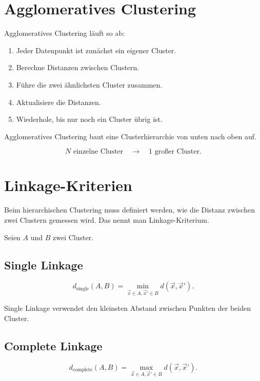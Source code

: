 \section{Agglomeratives Clustering}

Agglomeratives Clustering läuft so ab:

\begin{enumerate}
    \item Jeder Datenpunkt ist zunächst ein eigener Cluster.
    \item Berechne Distanzen zwischen Clustern.
    \item Führe die zwei ähnlichsten Cluster zusammen.
    \item Aktualisiere die Distanzen.
    \item Wiederhole, bis nur noch ein Cluster übrig ist.
\end{enumerate}

\begin{conceptbox}
Agglomeratives Clustering baut eine Clusterhierarchie von unten nach oben auf.

\[
    N \text{ einzelne Cluster}
    \quad
    \longrightarrow
    \quad
    1 \text{ großer Cluster}.
\]
\end{conceptbox}

\section{Linkage-Kriterien}

Beim hierarchischen Clustering muss definiert werden, wie die Distanz zwischen zwei Clustern gemessen wird.
Das nennt man Linkage-Kriterium.

Seien \(A\) und \(B\) zwei Cluster.

\subsection{Single Linkage}

\[
    d_{\mathrm{single}}(A,B)
    =
    \min_{\vec{x}\in A,\vec{x}'\in B}
    d(\vec{x},\vec{x}').
\]

Single Linkage verwendet den kleinsten Abstand zwischen Punkten der beiden Cluster.

\subsection{Complete Linkage}

\[
    d_{\mathrm{complete}}(A,B)
    =
    \max_{\vec{x}\in A,\vec{x}'\in B}
    d(\vec{x},\vec{x}').
\]

